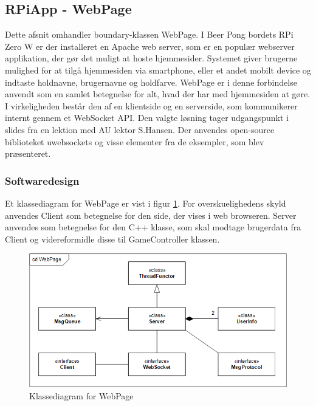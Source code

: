 \documentclass[Rapport/Rapport_main.tex]{subfiles}
\begin{document}
\subsection{RPiApp - WebPage}
Dette afsnit omhandler boundary-klassen WebPage. I Beer Pong bordets RPi Zero W er der installeret en Apache web server, som er en populær webserver applikation, der gør det muligt at hoste hjemmesider.\cite{apache_web_server} Systemet giver brugerne mulighed for at tilgå hjemmesiden via smartphone, eller et andet mobilt device og indtaste holdnavne, brugernavne og holdfarve. WebPage er i denne forbindelse anvendt som en samlet betegnelse for alt, hvad der har med hjemmesiden at gøre. I virkeligheden består den af en klientside og en serverside, som kommunikerer internt gennem et WebSocket API. Den valgte løsning tager udgangspunkt i slides\cite{websockets_getting_started} fra en lektion med AU lektor S.Hansen. Der anvendes open-source biblioteket uwebsockets\cite{uwebsockets_repo} og visse elementer fra de eksempler, som blev præsenteret.

\subsubsection{Softwaredesign}
Et klassediagram for WebPage er vist i figur \ref{fig:WebPage_class_diagram}. For overskuelighedens skyld anvendes Client som betegnelse for den side, der vises i web browseren. Server anvendes som betegnelse for den C++ klasse, som skal modtage brugerdata fra Client og videreformidle disse til GameController klassen.
\begin{figure}[H]
    \centering
    \includegraphics[width=1\textwidth]{Softwaredesign/RPiApp/graphic_RPi/cd_WebPage.png}
    \caption{Klassediagram for WebPage}
    \label{fig:WebPage_class_diagram}
\end{figure}
\end{document}
